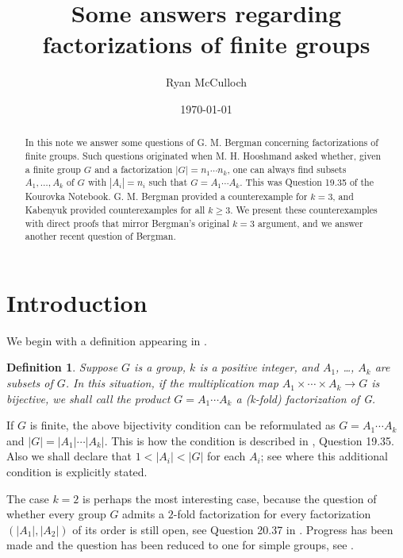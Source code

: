 \documentclass{amsart}
\title [Some answers regarding factorizations of finite groups]{Some answers regarding factorizations of finite groups}
\author[McCulloch]{Ryan McCulloch}
\date{\today}
\newtheorem{definition}[theorem]{Definition}
\begin{document}
	
\begin{abstract}
In this note we answer some questions of G. M. Bergman concerning factorizations of finite groups.  Such questions originated when M. H. Hooshmand asked whether, given a finite group $G$ and a factorization $|G| = n_1 \cdots n_k$, one can always find subsets $A_1, \dots , A_k$ of $G$ with $|A_i| = n_i$ such that $G = A_1 \cdots A_k$.  This was Question 19.35 of the Kourovka Notebook.  G. M. Bergman provided a counterexample for $k=3$, and Kabenyuk provided counterexamples for all $k \geq 3$.  We present these counterexamples with direct proofs that mirror Bergman's original $k=3$ argument, and we answer another recent question of Bergman.
\end{abstract}


\maketitle

\section{Introduction}
We begin with a definition appearing in \cite{berg, hoosh1, sands}.

\begin{definition}
Suppose $G$ is a group, $k$ is a positive integer, and $A_1$, \dots , $A_k$ are subsets of $G$. In this situation, if the multiplication map $A_1 \times \cdots \times A_k \rightarrow G$ is bijective, we shall call the product $G = A_1 \cdots A_k$ a (k-fold) \textnormal{factorization} of G.
\end{definition}

If $G$ is finite, the above bijectivity condition can be reformulated as $G = A_1 \cdots A_k$ and $|G| = |A_1| \cdots |A_k|$.  This is how the condition is described in \cite{kour}, Question 19.35.  Also we shall declare that $1 < |A_i| < |G|$ for each $A_i$; see \cite{hoosh1} where this additional condition is explicitly stated.

The case $k=2$ is perhaps the most interesting case, because the question of whether every group $G$ admits a $2$-fold factorization for every factorization $(|A_1|,|A_2|)$ of its order is still open, see Question 20.37 in \cite{kour}.  Progress has been made and the question has been reduced to one for simple groups, see \cite{bild, hoosh1}.  
\end{document}

